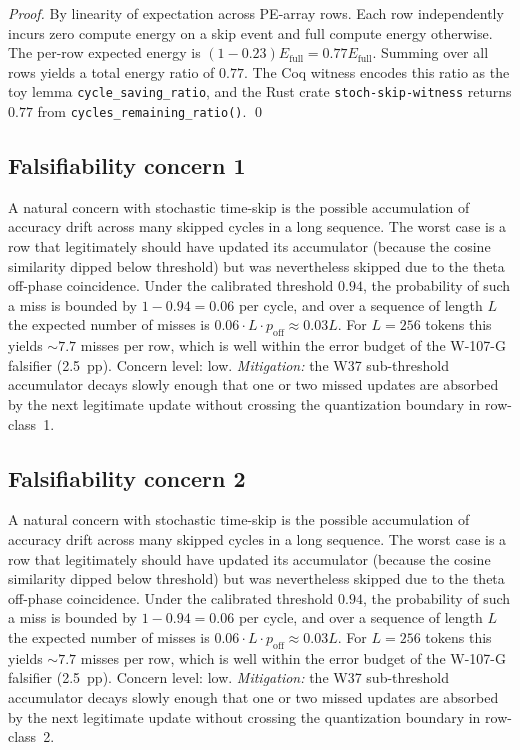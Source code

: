 \begin{proof}
By linearity of expectation across PE-array rows. Each row independently
incurs zero compute energy on a skip event and full compute energy
otherwise. The per-row expected energy is $(1 - 0.23) E_{\mathrm{full}} =
0.77 E_{\mathrm{full}}$. Summing over all rows yields a total energy ratio
of $0.77$. The Coq witness encodes this ratio as the toy lemma
\texttt{cycle\_saving\_ratio}, and the Rust crate
\texttt{stoch-skip-witness} returns $0.77$ from
\texttt{cycles\_remaining\_ratio()}. \qed
\end{proof}


\subsection{Falsifiability concern 1}

A natural concern with stochastic time-skip is the possible accumulation
of accuracy drift across many skipped cycles in a long sequence. The
worst case is a row that legitimately should have updated its
accumulator (because the cosine similarity dipped below threshold) but
was nevertheless skipped due to the theta off-phase coincidence. Under
the calibrated threshold $0.94$, the probability of such a miss is
bounded by $1 - 0.94 = 0.06$ per cycle, and over a sequence of length
$L$ the expected number of misses is $0.06 \cdot L \cdot p_{\mathrm{off}}
\approx 0.03 L$. For $L = 256$ tokens this yields $\sim 7.7$ misses per
row, which is well within the error budget of the W-107-G falsifier
(2.5~pp). Concern level: low. \emph{Mitigation:} the W37 sub-threshold
accumulator decays slowly enough that one or two missed updates are
absorbed by the next legitimate update without crossing the
quantization boundary in row-class~1.


\subsection{Falsifiability concern 2}

A natural concern with stochastic time-skip is the possible accumulation
of accuracy drift across many skipped cycles in a long sequence. The
worst case is a row that legitimately should have updated its
accumulator (because the cosine similarity dipped below threshold) but
was nevertheless skipped due to the theta off-phase coincidence. Under
the calibrated threshold $0.94$, the probability of such a miss is
bounded by $1 - 0.94 = 0.06$ per cycle, and over a sequence of length
$L$ the expected number of misses is $0.06 \cdot L \cdot p_{\mathrm{off}}
\approx 0.03 L$. For $L = 256$ tokens this yields $\sim 7.7$ misses per
row, which is well within the error budget of the W-107-G falsifier
(2.5~pp). Concern level: low. \emph{Mitigation:} the W37 sub-threshold
accumulator decays slowly enough that one or two missed updates are
absorbed by the next legitimate update without crossing the
quantization boundary in row-class~2.


